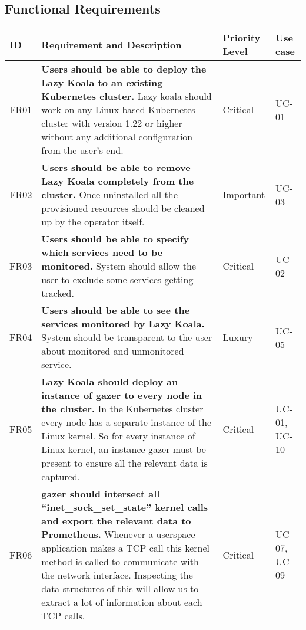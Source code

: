 
\newcommand{\functionalRequirement}[5]{
    #1 &
    \textbf{#2} \newline #3 &
    #4 &
    #5  \\ \hline
}

\subsection{Functional Requirements}

\begin{longtable}{|p{9mm}|p{107mm}|p{16mm}|p{13mm}|}
\hline
    \textbf{ID} &
    \textbf{Requirement and Description} &
    \textbf{Priority Level} &
    \textbf{Use case} \\ \hline


    \functionalRequirement
    {FR01}
    {Users should be able to deploy the Lazy Koala to an existing Kubernetes cluster.}
    {Lazy koala should work on any Linux-based Kubernetes cluster with version 1.22 or higher without any additional configuration from the user's end.}
    {Critical}
    {UC-01}
    
    \functionalRequirement
    {FR02}
    {Users should be able to remove Lazy Koala completely from the cluster.}
    {Once uninstalled all the provisioned resources should be cleaned up by the operator itself. }
    {Important}
    {UC-03}
    
        
    \functionalRequirement
    {FR03}
    {Users should be able to specify which services need to be monitored.}
    {System should allow the user to exclude some services getting tracked.}
    {Critical}
    {UC-02}
    
        
    \functionalRequirement
    {FR04}
    {Users should be able to see the services monitored by Lazy Koala.}
    {System should be transparent to the user about monitored and unmonitored service.}
    {Luxury}
    {UC-05}
    
        
    \functionalRequirement
    {FR05}
    {Lazy Koala should deploy an instance of \ac{gazer} to every node in the cluster.}
    {In the Kubernetes cluster every node has a separate instance of the Linux kernel. So for every instance of Linux kernel, an instance \ac{gazer} must be present to ensure all the relevant data is captured.}
    {Critical}
    {UC-01, UC-10}
    
        
    \functionalRequirement
    {FR06}
    {\ac{gazer} should intersect all “inet\_sock\_set\_state” kernel calls and export the relevant data to Prometheus.}
    {Whenever a userspace application makes a TCP call this kernel method is called to communicate with the network interface. Inspecting the data structures of this will allow us to extract a lot of information about each TCP calls.}
    {Critical}
    {UC-07, UC-09}
    

\end{longtable}

